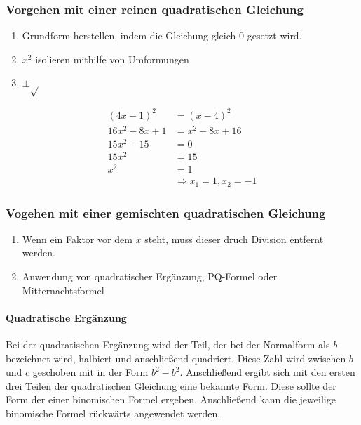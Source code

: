 \subsubsection{Vorgehen mit einer reinen quadratischen Gleichung}
\begin{enumerate}
	\item Grundform herstellen, indem die Gleichung gleich $0$ gesetzt wird.
	\item $x^2$ isolieren mithilfe von Umformungen
	\item $\pm\sqrt{}$
\end{enumerate}
\begin{beispiel}
	\begin{align*}
		(4x-1)^2&=(x-4)^2\\
		16x^2-8x+1&=x^2-8x+16\\
		15x^2-15&=0\\
		15x^2&=15\\
		x^2&=1\\
		&\Rightarrow x_1=1, x_2=-1
	\end{align*}
\end{beispiel}
\subsubsection{Vogehen mit einer gemischten quadratischen Gleichung}
\begin{enumerate}
	\item Wenn ein Faktor vor dem $x$ steht, muss dieser druch Division entfernt werden. 
	\item Anwendung von quadratischer Ergänzung, PQ-Formel oder Mitternachtsformel
\end{enumerate}
\pagebreak
\paragraph{Quadratische Ergänzung} Bei der quadratischen Ergänzung wird der Teil, der bei der Normalform als $b$ bezeichnet wird, halbiert und anschließend quadriert. Diese Zahl wird zwischen $b$ und $c$ geschoben mit in der Form $b^2-b^2$. Anschließend ergibt sich mit den ersten drei Teilen der quadratischen Gleichung eine bekannte Form. Diese sollte der Form der einer binomischen Formel ergeben. Anschließend kann die jeweilige binomische Formel rückwärts angewendet werden. 

